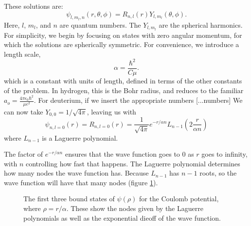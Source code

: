 \documentclass[12pt,twoside]{reedthesis}
\newcommand{\eqn}[1]{\begin{equation}#1\end{equation}}
\begin{document}
These solutions are:
\eqn{
\psi_{l, m_l, n} (r, \theta, \phi) = R_{n,l}(r) Y_{l,m_l}(\theta,\phi)\mbox{.}
}
Here, $l$, $m_l$, and $n$ are quantum numbers. The $Y_{l, m_l}$ are the spherical harmonics. For simplicity, we begin by focusing on states with zero angular momentum, for which the solutions are spherically symmetric.
For convenience, we introduce a length scale, 
\eqn{
\alpha = \frac{\hbar^2}{C \mu}\mbox{.}
\label{eq:bohrradius}
}
which is a constant with units of length, defined in terms of the other constants of the problem. 
In hydrogen, this is the Bohr radius, and reduces to the familiar $a_o = \frac{4\pi \epsilon_0 \hbar^2}{\mu e^2}$. For deuterium, if we insert the appropriate numbers [...numbers] 
We can now take $Y_{0,0} = 1/\sqrt{4 \pi}$, leaving us with
\eqn{
\psi_{n, l =0}(r) = R_{n , l= 0}(r) = \frac{1}{\sqrt{4\pi}} e^{-r /\alpha n}L_{n-1} \left(2\frac{r}{ \alpha n}\right)
\label{eq:SWE-coulomb}
}
where $L_{n-1}$ is a Laguerre polynomial. 

The factor of $e^{-r /\alpha n}$ ensures that the wave function goes to 0 as $r$ goes to infinity, with $n$ controlling how fast that happens. The Laguerre polynomial determines how many nodes the wave function has. Because $L_{n-1}$ has $n-1$ roots, so the wave function will have that many nodes (figure \ref{fig:wavefunctions}).
\begin{figure}[h]
\centering
{}
\caption[The first three bound states of $\psi(\rho)$ for the Coulomb potential]{The first three bound states of $\psi(\rho)$ for the Coulomb potential, where $\rho = r/\alpha$. These show the nodes given by the Laguerre polynomials as well as the exponential dieoff of the wave function.}
\label{fig:wavefunctions}
\end{figure}
\end{document}
